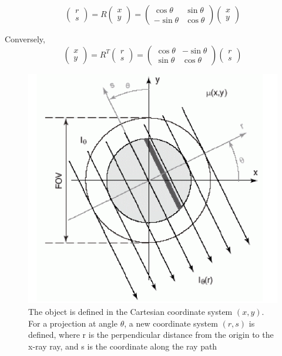 \documentclass{article}
\theoremstyle{definition}
\begin{document}
$$\begin{pmatrix} r \\ s \end{pmatrix} = R \begin{pmatrix} x \\ y \end{pmatrix} = \begin{pmatrix} \cos\theta & \sin\theta \\ -\sin\theta & \cos\theta \end{pmatrix} \begin{pmatrix} x \\ y \end{pmatrix}$$

Conversely,
$$\begin{pmatrix} x \\ y \end{pmatrix} = R^T \begin{pmatrix} r \\ s \end{pmatrix} = \begin{pmatrix} \cos\theta & -\sin\theta \\ \sin\theta & \cos\theta \end{pmatrix} \begin{pmatrix} r \\ s \end{pmatrix}$$

\begin{figure}[H]
	\includegraphics[scale=0.6]{coordinate_system.png}
	\caption{The object is defined in the Cartesian coordinate system $(x,y)$. For a projection at angle $\theta$, a new coordinate system $(r,s)$ is defined, where r is the perpendicular distance from the origin to the x-ray ray, and s is the coordinate along the ray path}
	\label{fig:coord}
\end{figure}
\end{document}
